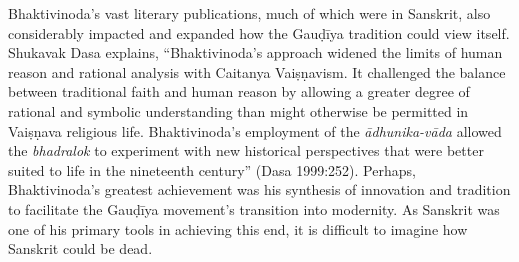 Bhaktivinoda’s vast literary publications, much of which were in Sanskrit, also considerably impacted and expanded how the Gauḍīya tradition could view itself. Shukavak Dasa explains, “Bhaktivinoda’s approach widened the limits of human reason and rational analysis with Caitanya Vaiṣṇavism. It challenged the balance between traditional faith and human reason by allowing a greater degree of rational and symbolic understanding than might otherwise be permitted in Vaiṣṇava religious life. Bhaktivinoda’s employment of the {\sl ādhunika-vāda} allowed the {\sl bhadralok} to experiment with new historical perspectives that were better suited to life in the nineteenth century” (Dasa 1999:252). Perhaps, Bhaktivinoda’s greatest achievement was his synthesis of innovation and tradition to facilitate the Gauḍīya movement’s transition into modernity. As Sanskrit was one of his primary tools in achieving this end, it is difficult to imagine how Sanskrit could be dead.
\vskip 2pt

